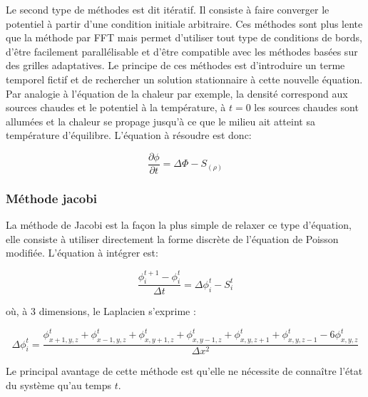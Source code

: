Le second type de méthodes est dit itératif. 
Il consiste à faire converger le potentiel à partir d'une condition initiale arbitraire. 
Ces méthodes sont plus lente que la méthode par \ac{FFT} mais permet d'utiliser tout type de conditions de bords, d'être facilement parallélisable et d'être compatible avec les méthodes basées sur des grilles adaptatives.
Le principe de ces méthodes est d'introduire un terme temporel fictif et de rechercher un solution stationnaire à cette nouvelle équation.
Par analogie à l'équation de la chaleur par exemple, la densité correspond aux sources chaudes et le potentiel à la température, à $t=0$ les sources chaudes sont allumées et la chaleur se propage jusqu'à ce que le milieu ait atteint sa température d'équilibre. 
L'équation à résoudre est donc:

\begin{equation}
\dfrac{\partial \phi}{\partial t} = \Delta \Phi -S_{(\rho)}
\end{equation}



\subsubsection{Méthode jacobi}

La méthode de Jacobi est la façon la plus simple de relaxer ce type d'équation, elle consiste à utiliser directement la forme discrète de l'équation de Poisson modifiée. 
L'équation à intégrer est:

\[ \dfrac{\phi^{t+1}_i - \phi^{t}_i}{\Delta t}  =  \Delta \phi_i^t - S_i^t \]

où, à 3 dimensions, le Laplacien s'exprime :

\[ \Delta \phi_i^t = \dfrac{\phi_{x+1,y,z}^t  + \phi_{x-1,y,z}^t + \phi_{x,y+1,z}^t  + \phi_{x,y-1,z}^t + \phi_{x,y,z+1}^t + \phi_{x,y,z-1}^t	- 6\phi_{x,y,z}^t}{\Delta x ^2} \]
		
Le principal avantage de cette méthode est qu'elle ne nécessite de connaître l'état du système qu'au temps $t$.

